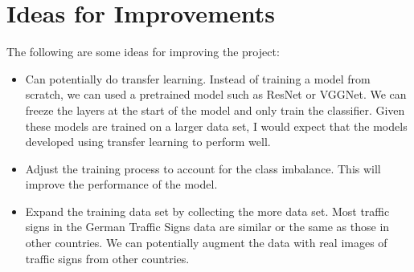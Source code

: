 \documentclass[12pt,twoside]{article}
\begin{document}
\newpage

\section{Ideas for Improvements}
The following are some ideas for improving the project:
\begin{itemize}
	\item Can potentially do transfer learning. Instead of training a model from scratch, we can used a pretrained model such as ResNet or VGGNet. We can freeze the layers at the start of the model and only train the classifier. Given these models are trained on a larger data set, I would expect that the models developed using transfer learning to perform well.
	\item Adjust the training process to account for the class imbalance. This will improve the performance of the model.
	\item Expand the training data set by collecting the more data set. Most traffic signs in the German Traffic Signs data are similar or the same as those in other countries. We can potentially augment the data with real images of traffic signs from other countries.
\end{itemize}



%
%
\end{document}
